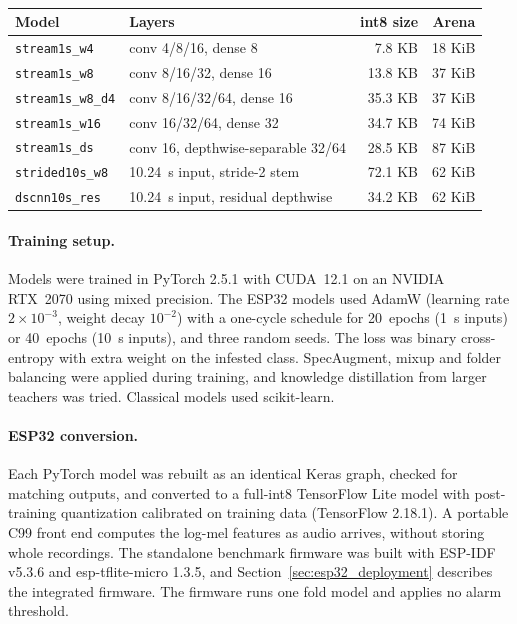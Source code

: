 \begin{table}[htbp]
\centering
\color{black}
\small
\caption{}
\label{tab:ml_esp32_models}
\begin{tabular}{llrr}
\toprule
Model & Layers & int8 size & Arena \\
\midrule
\texttt{stream1s\_w4} & conv 4/8/16, dense 8 & 7.8 KB & 18 KiB \\
\texttt{stream1s\_w8} & conv 8/16/32, dense 16 & 13.8 KB & 37 KiB \\
\texttt{stream1s\_w8\_d4} & conv 8/16/32/64, dense 16 & 35.3 KB & 37 KiB \\
\texttt{stream1s\_w16} & conv 16/32/64, dense 32 & 34.7 KB & 74 KiB \\
\texttt{stream1s\_ds} & conv 16, depthwise-separable 32/64 & 28.5 KB & 87 KiB \\
\texttt{strided10s\_w8} & 10.24~s input, stride-2 stem & 72.1 KB & 62 KiB \\
\texttt{dscnn10s\_res} & 10.24~s input, residual depthwise & 34.2 KB & 62 KiB \\
\bottomrule
\end{tabular}
\end{table}

\paragraph{Training setup.} Models were trained in PyTorch 2.5.1 with CUDA~12.1 on an NVIDIA RTX~2070 using mixed precision. The ESP32 models used AdamW (learning rate $2\times10^{-3}$, weight decay $10^{-2}$) with a one-cycle schedule for 20~epochs (1~s inputs) or 40~epochs (10~s inputs), and three random seeds. The loss was binary cross-entropy with extra weight on the infested class. SpecAugment, mixup and folder balancing were applied during training, and knowledge distillation from larger teachers was tried. Classical models used scikit-learn.

\paragraph{ESP32 conversion.} Each PyTorch model was rebuilt as an identical Keras graph, checked for matching outputs, and converted to a full-int8 TensorFlow Lite model with post-training quantization calibrated on training data (TensorFlow 2.18.1). A portable C99 front end computes the log-mel features as audio arrives, without storing whole recordings. The standalone benchmark firmware was built with ESP-IDF v5.3.6 and esp-tflite-micro 1.3.5, and Section~\ref{sec:esp32_deployment} describes the integrated firmware. The firmware runs one fold model and applies no alarm threshold.

